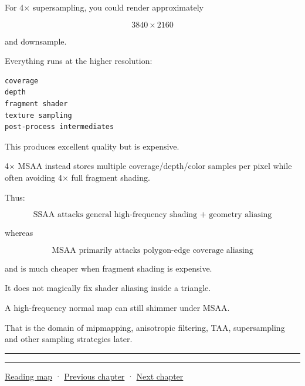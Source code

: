 For 4× supersampling, you could render approximately

\[
3840\times2160
\]

and downsample.

Everything runs at the higher resolution:

\begin{verbatim}
coverage
depth
fragment shader
texture sampling
post-process intermediates
\end{verbatim}

This produces excellent quality but is expensive.

4× MSAA instead stores multiple coverage/depth/color samples per pixel while often avoiding 4× full fragment shading.

Thus:

\[
\boxed{
\text{SSAA attacks general high-frequency shading + geometry aliasing}
}
\]

whereas

\[
\boxed{
\text{MSAA primarily attacks polygon-edge coverage aliasing}
}
\]

and is much cheaper when fragment shading is expensive.

It does not magically fix shader aliasing inside a triangle.

A high-frequency normal map can still shimmer under MSAA.

That is the domain of mipmapping, anisotropic filtering, TAA, supersampling and other sampling strategies later.

\begin{center}\rule{0.5\linewidth}{0.5pt}\end{center}

\begin{center}\rule{0.5\linewidth}{0.5pt}\end{center}

\hyperref[volume-reading-map]{Reading map} · \hyperref[03-visual-computing-i-ch012]{Previous chapter} · \hyperref[03-visual-computing-i-ch014]{Next chapter}
